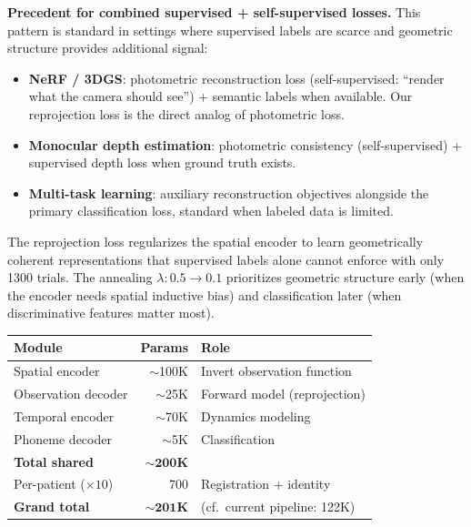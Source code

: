 \documentclass[11pt,letterpaper]{article}
\begin{document}
\textbf{Precedent for combined supervised + self-supervised losses.} This pattern is standard in settings where supervised labels are scarce and geometric structure provides additional signal:
\begin{itemize}[leftmargin=2em]
\item \textbf{NeRF / 3DGS}: photometric reconstruction loss (self-supervised: ``render what the camera should see'') + semantic labels when available. Our reprojection loss is the direct analog of photometric loss.
\item \textbf{Monocular depth estimation}: photometric consistency (self-supervised) + supervised depth loss when ground truth exists.
\item \textbf{Multi-task learning}: auxiliary reconstruction objectives alongside the primary classification loss, standard when labeled data is limited.
\end{itemize}
The reprojection loss regularizes the spatial encoder to learn geometrically coherent representations that supervised labels alone cannot enforce with only 1300 trials. The annealing $\lambda: 0.5 \to 0.1$ prioritizes geometric structure early (when the encoder needs spatial inductive bias) and classification later (when discriminative features matter most).

\begin{table}[ht!]\centering\small
\begin{tabular}{@{}lrl@{}}
\toprule
\textbf{Module} & \textbf{Params} & \textbf{Role} \\
\midrule
Spatial encoder & ${\sim}$100K & Invert observation function \\
Observation decoder & ${\sim}$25K & Forward model (reprojection) \\
Temporal encoder & ${\sim}$70K & Dynamics modeling \\
Phoneme decoder & ${\sim}$5K & Classification \\
\midrule
\textbf{Total shared} & $\mathbf{{\sim}200}$\textbf{K} & \\
Per-patient ($\times 10$) & 700 & Registration + identity \\
\textbf{Grand total} & $\mathbf{{\sim}201}$\textbf{K} & (cf.\ current pipeline: 122K) \\
\bottomrule
\end{tabular}
\end{table}


\end{document}
